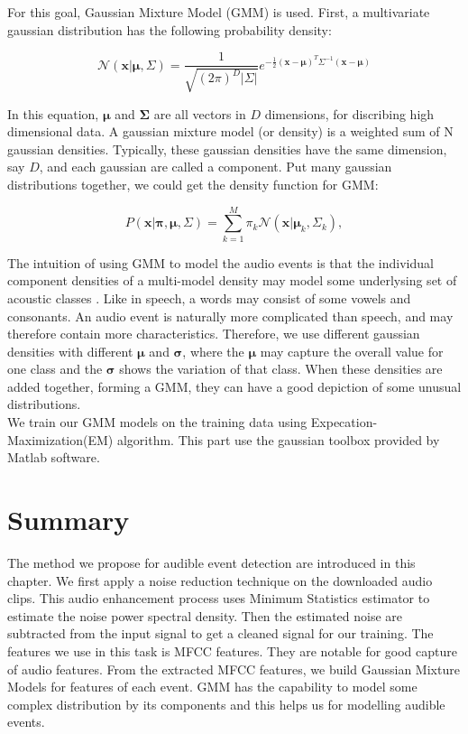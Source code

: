 For this goal, Gaussian Mixture Model (GMM) is used. 
First, a multivariate gaussian distribution has the following probability density:

\begin{equation}
 \mathcal{N}(\mathbf{x}| \mathbf{\mu}, \Sigma) = 
\frac{1}{\sqrt{(2\pi)^D|\Sigma|}}e^{-\frac{1}{2}(\mathbf{x}-\mathbf{\mu})^T \Sigma^{-1} (\mathbf{x}-\mathbf{\mu})}
\end{equation}

In this equation, $\mathbf{\mu}$ and $\mathbf{\Sigma}$ are all vectors in $D$ dimensions, for discribing high dimensional data. 
A gaussian mixture model (or density) is a weighted sum of N gaussian densities. 
Typically, these gaussian densities have the same dimension, say $D$, and each gaussian are called a component.  
Put many gaussian distributions together, we could get the density function for GMM: 

\begin{equation}
P(\mathbf{x}|\mathbf{\pi},\mathbf{\mu},\Sigma) = \sum_{k = 1}^{M} \pi_k
\mathcal{N}(\mathbf{x}|\mathbf{\mu}_k, \Sigma_k),
\end{equation} 

The intuition of using GMM to model the audio events is that the individual component densities of a multi-model density may model some underlysing set of acoustic classes \cite{reynolds1995robust}. 
Like in speech, a words may consist of some vowels and consonants. 
An audio event is naturally more complicated than speech, and may therefore contain more characteristics. 
Therefore, we use different gaussian densities with different $\mathbf{\mu}$ and $\mathbf\sigma$, where the $\mathbf\mu$ may capture the overall value for one class and the $\mathbf\sigma$ shows the variation of that class.  
When these densities are added together, forming a GMM, they can have a good depiction of some unusual distributions. \\ 

We train our GMM models on the training data using Expecation-Maximization(EM) algorithm. 
This part use the gaussian toolbox provided by Matlab software. 


\section{Summary}
The method we propose for audible event detection are introduced in this chapter. 
We first apply a noise reduction technique on the downloaded audio clips. 
This audio enhancement process uses Minimum Statistics estimator to estimate the noise power spectral density. 
Then the estimated noise are subtracted from the input signal to get a cleaned signal for our training. 
The features we use in this task is MFCC features. 
They are notable for good capture of audio features. 
From the extracted MFCC features, we build Gaussian Mixture Models for features of each event. 
GMM has the capability to model some complex distribution by its components and this helps us for modelling audible events.  
